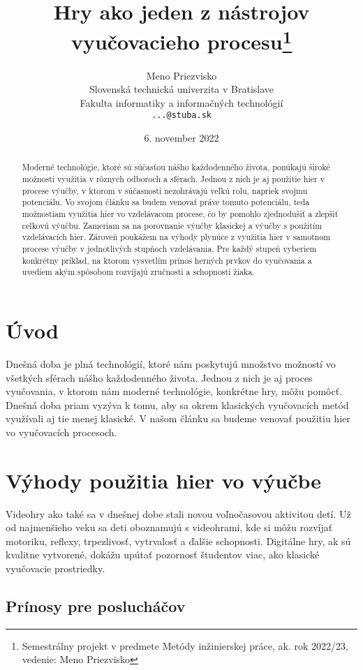 \documentclass[10pt,twoside,slovak,a4paper]{article}
\title{Hry ako jeden z nástrojov vyučovacieho procesu\thanks{Semestrálny projekt v predmete Metódy inžinierskej práce, ak. rok 2022/23, vedenie: Meno Priezvisko}}
\author{Meno Priezvisko\\[2pt]
	{\small Slovenská technická univerzita v Bratislave}\\
	{\small Fakulta informatiky a informačných technológií}\\
	{\small \texttt{...@stuba.sk}}
	}
\date{\small 6. november 2022}
\begin{document}
\maketitle

\begin{abstract}

Moderné technológie, ktoré sú súčasťou nášho každodenného života, ponúkajú široké možnosti využitia v rôznych odboroch a sférach. Jednou z nich je aj použitie hier v procese výučby\cite{Zea2009-eh}, v ktorom v súčasnosti nezohrávajú veľkú rolu, napriek svojmu potenciálu. Vo svojom článku sa budem venovať práve tomuto potenciálu, teda možnostiam využitia hier vo vzdelávacom procese, čo by pomohlo zjednodušiť a zlepšiť celkovú výučbu. Zameriam sa na porovnanie výučby klasickej a výučby s použitím vzdelávacích hier. Zároveň poukážem na výhody plynúce z využitia hier v samotnom procese výučby v jednotlivých stupňoch vzdelávania. Pre každý stupeň vyberiem konkrétny príklad, na ktorom vysvetlím prínos herných prvkov do vyučovania a uvediem akým spôsobom rozvíjajú zručnosti a schopnosti žiaka.

\end{abstract}



\section{Úvod}

Dnešná doba je plná technológií, ktoré nám poskytujú množstvo možností vo všetkých sférach nášho každodenného života. Jednou z nich je aj proces vyučovania, v ktorom nám moderné technológie, konkrétne hry, môžu pomôcť. Dnešná doba priam vyzýva k tomu, aby sa okrem klasických vyučovacích metód využívali aj tie menej klasické. V našom článku sa budeme venovať použitiu hier vo vyučovacích procesoch.

\section{Výhody použitia hier vo výučbe}

Videohry ako také sa v dnešnej dobe stali novou voľnočasovou aktivitou detí. Už od najmenšieho veku sa deti oboznamujú s videohrami, kde si môžu rozvíjať motoriku, reflexy, trpezlivosť, vytrvalosť a ďalšie schopnosti\cite{Chen2012-ao}. Digitálne hry, ak sú kvalitne vytvorené, dokážu upútať pozornosť študentov viac, ako klasické vyučovacie prostriedky.

\subsection{Prínosy pre poslucháčov}
\end{document}
